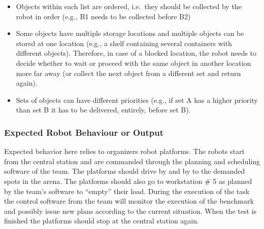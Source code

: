 \begin{itemize}
\item Objects within each list are ordered, i.e.~they should be collected by the robot in order (e.g., B1 needs to be collected before B2)


\item Some objects have multiple storage locations and multiple objects can be stored at one location (e.g., a shelf containing several containers with different objects). Therefore, in case of a blocked location, the robot needs to decide whether to wait or proceed with the same object in another location more far away (or collect the next object from a different set and return again).
\item Sets of objects can have different priorities (e.g., if set A has a higher priority than set B it has to be delivered, entirely, before set B).
\end{itemize}

\subsubsection{Expected Robot Behaviour or Output}
\label{sssec:PlanningSchedulingOutput}

Expected behavior here relies to organizers robot platforms. 
The robots start from the central station and are commanded through the planning and scheduling software of the team.
The platforms should drive by and by to the demanded spots in the arena.
The platforms should also go to workstation \# 5 as planned by the team's software to ``empty'' their load.
During the execution of the task the control software from the team will monitor the execution of the benchmark and possibly issue new plans according to the current situation.
When the test is finished the platforms should stop at the central station again.


